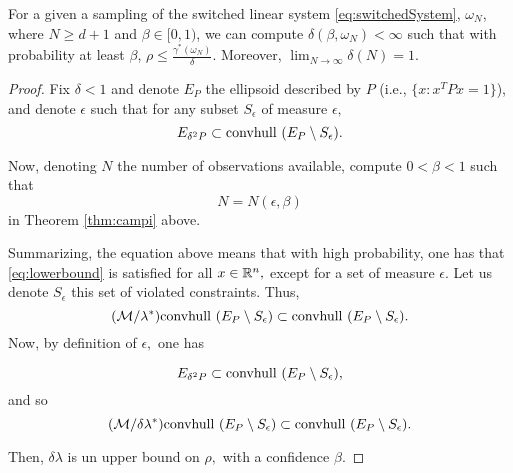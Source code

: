 \begin{theorem} \label{thm:mainTheorem} For a given a sampling of the switched linear system \eqref{eq:switchedSystem}, $\omega_N$, where $N \geq d+1$ and $\beta \in [0,1)$, we can compute $\delta(\beta, \omega_N) < \infty$ such that with probability at least $\beta$, $\rho \leq \frac{\gamma^*(\omega_N)}{\delta}$. Moreover, $\lim_{N \to \infty} \delta(N) = 1$.
\end{theorem}
\begin{proof}
Fix $\delta<1$ and denote $E_P$ the ellipsoid described by $P$ (i.e., $\{x:x^TPx= 1\}$), and denote $\epsilon$ such that for any subset $S_\epsilon$ of measure $\epsilon,$ 
$$ E_{\delta^2P} \subset  \mbox{convhull } (E_P\setminus S_\epsilon) .$$ 
  	
Now, denoting $N$ the number of observations available, compute $0< \beta< 1$ such that $$N=N(\epsilon,\beta)$$ in Theorem \ref{thm:campi} above. 

Summarizing, the equation above means that with high probability, one has that \eqref{eq:lowerbound} is satisfied for all $x\in \mathbb{R}^n,$ except for a set of measure $\epsilon.$  Let us denote $S_\epsilon$ this set of violated constraints.  Thus, $$(\mathcal{M}/\lambda^*) \mbox{convhull } (E_P\setminus S_\epsilon) \subset \mbox{convhull } (E_P\setminus S_\epsilon).$$  Now, by definition of $\epsilon,$ one has

$$ E_{\delta^2P} \subset  \mbox{convhull } (E_P\setminus S_\epsilon) ,$$ and so
$$
(\mathcal{M}/\delta \lambda^*) \mbox{convhull } (E_P \setminus S_\epsilon) \subset \mbox{convhull } (E_P\setminus S_\epsilon).$$

Then, $\delta\lambda$ is un upper bound on $\rho,$ with a confidence $\beta.$ 
\end{proof}
